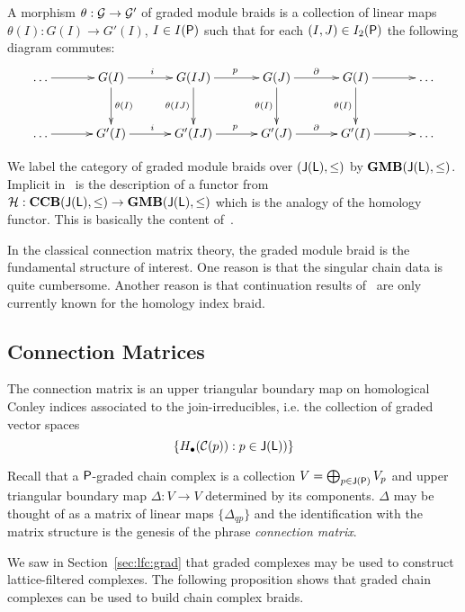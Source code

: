 A morphism $\theta:{\mathcal G}\to {\mathcal G}'$ of graded module braids is a collection of linear maps $\theta(I):G(I)\to G'(I)$, $I\in I({\mathsf P})$ such that for each $(I,J)\in I_2({\mathsf P})$ the following diagram commutes:
\[
\xymatrixrowsep{0.4in}
\xymatrixcolsep{0.45in}
\xymatrix{
\ldots \ar@{->}[r] & G(I) \ar@{->}[d]^{\theta(I)} \ar@{->}[r]^{i} & G(IJ) \ar@{->}[d]_{\theta(IJ)} \ar@{->}[r]^{p} & G(J) \ar@{->}[d]_{\theta(I)} \ar@{->}[r]^{\partial} & G(I) \ar@{->}[d]_{\theta(I)} \ar@{->}[r] & \ldots\\
\ldots \ar@{->}[r] & G'(I) \ar@{->}[r]^{i} & G'(IJ) \ar@{->}[r]^{p} & G'(J) \ar@{->}[r]^{\partial} & G'(I) \ar@{->}[r] &\ldots
}
\]

We label the category of graded module braids over $({\mathsf J}({\mathsf L}),\leq)$ by ${\bf GMB}({\mathsf J}({\mathsf L}),\leq)$.  Implicit in~\cite{fran} is the description of a functor from ${\mathcal H}:{\bf CCB}({\mathsf J}({\mathsf L}),\leq)\to {\bf GMB}({\mathsf J}({\mathsf L}),\leq)$ which is the analogy of the homology functor.  This is basically the content of~\cite[Proposition 2.7]{fran}.


\begin{rem}
In the classical connection matrix theory, the graded module braid is the fundamental structure of interest.  One reason is that the singular chain data is quite cumbersome.  Another reason is that continuation results of~\cite{fran3}  are only currently known for the homology index braid.
\end{rem}


\subsection{Connection Matrices}

The connection matrix is an upper triangular boundary map on homological Conley indices associated to the join-irreducibles, i.e. the collection of graded vector spaces $$\{H_\bullet({\mathcal C}(p)):p\in {\mathsf J}({\mathsf L}))\}$$


Recall that a ${\mathsf P}$-graded chain complex is a collection $V=\bigoplus_{p\in {\mathsf J}({\mathsf P})} V_p$ and upper triangular boundary map $\Delta:V\to V$ determined by its components.  $\Delta$ may be thought of as a matrix of linear maps $\{\Delta_{qp}\}$ and the identification with the matrix structure is the genesis of the phrase {\em connection matrix}.  

We saw in Section~\ref{sec:lfc:grad} that graded complexes may be used to construct lattice-filtered complexes.  The following proposition shows that graded chain complexes can be used to build chain complex braids.

